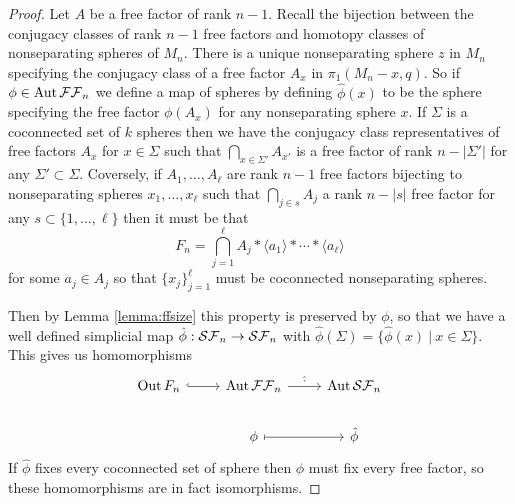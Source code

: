 
\bridson*

\begin{proof}
  Let $A$ be a free factor of rank $n-1$.
  Recall the bijection between the conjugacy classes of rank $n-1$ free factors and homotopy classes of nonseparating spheres of $M_n$.
  There is a unique nonseparating sphere $z$ in $M_n$
  specifying the conjugacy class of a free factor $A_x$ in $\pi_1 (M_n-x,q)$.
  So if $\phi \in \operatorname{Aut} { \mathcal {FF}_n }$ we define a map of spheres by defining $\hat \phi(x)$ to be the sphere
  specifying the free factor $\phi(A_x)$ for any nonseparating sphere $x$.
  If $\Sigma$ is a coconnected set of $k$ spheres
  then we have the conjugacy class representatives of free factors $A_x$ for $x\in \Sigma$ such that $\bigcap_{x \in \Sigma'} A_{x'}$
  is a free factor of rank $n-|\Sigma'|$ for any $\Sigma' \subset \Sigma$.
  Coversely, if $A_1, \ldots, A_\ell$ are rank $n-1$ free factors bijecting to nonseparating spheres $x_1, \ldots, x_\ell$
  such that $\bigcap_{j \in s} A_j$ a rank $n-|s|$ free factor for any $s \subset \{1, \ldots, \ell\}$ then it must be that
  $$F_n  = \bigcap_{j=1}^\ell A_j \ast \langle a_1 \rangle  \ast \cdots \ast \langle a_\ell \rangle$$
  for some $a_j \in A_j$ so that $\{x_j\}_{j=1}^\ell$ must be coconnected nonseparating spheres.

  Then by Lemma \ref{lemma:ffsize} this property is preserved by $\phi$, so that
  we have a well defined simplicial map $\hat \phi: { \mathcal {SF}_n } \to {\ensuremath{ \mathcal {SF}_n }}$
  with
  $\hat \phi (\Sigma) = \{ \hat \phi(x) \ | \ x \in \Sigma \}$.
  This gives us homomorphisms
  $$
  \begin{tikzcd}
    \oout F_n \arrow[hookrightarrow]{r} &
    \aaut \ffn \arrow{r}{\hat{\cdot}} &
    \aaut \sfn\\
    &
    \phi \arrow[mapsto]{r} & \hat \phi
  \end{tikzcd}
  $$
If $\hat \phi$ fixes every coconnected set of sphere then $\phi$ must fix every free factor,
so these homomorphisms are in fact isomorphisms.
\end{proof}
